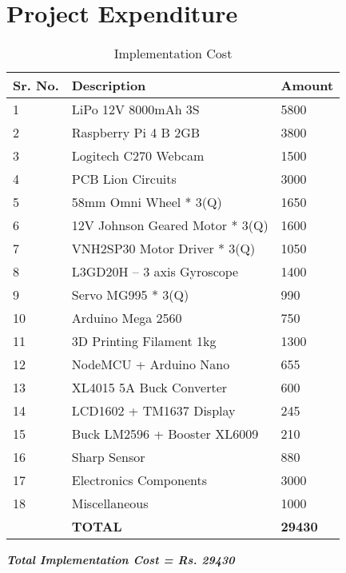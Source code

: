 \chapter{Project Expenditure}

\begin{table}[htbp]
\caption{Implementation Cost}
\begin{center}
\begin{tabular}{|p{2cm}|p{6cm}|p{4cm}|}
\hline \textbf{Sr. No.} & \textbf{Description} & \textbf{Amount}\\
\hline 1 & LiPo 12V 8000mAh 3S & 5800\\
\hline 2 & Raspberry Pi 4 B 2GB & 3800\\
\hline 3 & Logitech C270 Webcam & 1500\\
\hline 4 & PCB Lion Circuits & 3000\\
\hline 5 & 58mm Omni Wheel * 3(Q) & 1650\\
\hline 6 & 12V Johnson Geared Motor * 3(Q) & 1600\\
\hline 7 & VNH2SP30 Motor Driver * 3(Q) & 1050\\
\hline 8 & L3GD20H – 3 axis Gyroscope & 1400\\
\hline 9 & Servo MG995 * 3(Q) & 990\\
\hline 10 & Arduino Mega 2560 & 750\\
\hline 11 & 3D Printing Filament 1kg & 1300\\
\hline 12 & NodeMCU + Arduino Nano & 655\\
\hline 13 & XL4015 5A Buck Converter & 600\\
\hline 14 & LCD1602 + TM1637 Display & 245\\
\hline 15 & Buck LM2596 + Booster XL6009 & 210\\
\hline 16 & Sharp Sensor & 880\\
\hline 17 & Electronics Components & 3000\\
\hline 18 & Miscellaneous & 1000\\
\hline & \textbf{TOTAL} & \textbf{29430}\\
\hline
\end{tabular}
\end{center}
\end{table}

\begin{center}
\textbf{\textit{Total Implementation Cost = Rs. 29430}}
\end{center}
